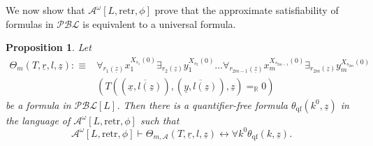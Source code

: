 \documentclass[11pt]{amsart}
\newtheorem{proposition}[theorem]{Proposition}
\theoremstyle{definition}
\theoremstyle{remark}
\def\RR{\mathbb{R}}
\begin{document}
We now show that $\mathcal{A}^\omega[L,\mathrm{retr},\phi]$ prove that the approximate satisfiability of formulas in $\mathcal{PBL}$ is equivalent to a universal formula. 
\begin{proposition}
\label{prop:approx:univ}
Let
\begin{align*}
    \Theta_m(T,\underline{r},l,\underline{z}):\equiv &\forall_{r_1(\underline{z})} x_1^{X_{s_1}(0)} \exists_{r_2(\underline{z})} y_1^{X_{s_2}(0)} \ldots \forall_{r_{2m-1}(\underline{z})} x_m^{X_{s_{2m-1}}(0)}\exists_{r_{2m}(\underline{z})} y_m^{X_{s_{2m}}(0)}\\&(T((\overline{\underline{x},l(\underline{z})}),(\overline{\underline{y},l(\underline{z})}),\underline{z})=_\RR 0)
\end{align*}
be a formula in $\mathcal{PBL}[L]$. Then there is a quantifier-free formula $\theta_\mathrm{qf}(k^0,\underline{z})$ in the language of  $\mathcal{A}^\omega[L,\mathrm{retr},\phi]$ such that
\[
\mathcal{A}^\omega[L,\mathrm{retr},\phi]\vdash \Theta_{m,\mathcal{A}}(T,\underline{r},l,\underline{z}) \leftrightarrow \forall k^0\theta_\mathrm{qf}(k,\underline{z}).
\]
\end{proposition}
\end{document}
